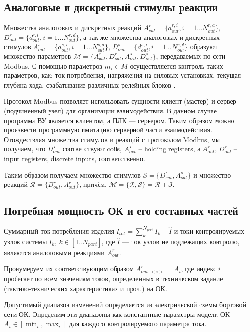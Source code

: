 \subsection{Аналоговые и дискретный стимулы реакции} \label{sect:stimulus_reactions_def}

Множества аналоговых и дискретных реакций
$A^r_{out} = \{a^{r,i}_{out}, i = 1 \dots N^{r,a}_{out}\}$,
$D^r_{out} = \{d^{r,i}_{out}, i = 1 \dots N^{r,d}_{out}\}$,
а так же множества аналоговых и дискретных стимулов
$A^s_{out} = \{a^{s,i}_{out}, i = 1 \dots N^{s,a}_{out}\}$,
$D^s_{out} = \{d^{s,i}_{out}, i = 1 \dots N^{s,d}_{out}\}$
образуют множество параметров $\mathcal{M} = \{A^r_{out}, D^r_{out}, A^s_{out}, D^s_{out}\}$,
передаваемых по сети Modbus. С помощью параметров $m_i \in M$ осуществляется контроль таких параметров,
как: ток потребления, напряжения на силовых установках,
текущая глубина хода, срабатывание различных релейных блоков \todo{\ldots}.

Протокол Modbus позволяет использовать сущности клиент (мастер) и сервер (подчиненный узел)
для организации взаимодействия. В данном случае программа ВУ является клиентом, а ПЛК --- сервером.
Таким образом можно произвести программную имитацию серверной части взаимодействия.
Отождествляя множества стимулов и реакций с протоколом Modbus, мы получаем, что
$D^s_{out}$ соответствуют coils, $A^s_{out}$ -- holding registers,
а $A^r_{out}$,  $D^r_{out}$ -- input registers, discrete inputs, соответственно.

Таким образом получаем множество стимулов $\mathcal{S} = \{D^s_{out}, A^s_{out}\}$
и множество реакций $\mathcal{R} = \{D^r_{out}, A^r_{out}\}$, причём, $\mathcal{M} = \{\mathcal{R}, \mathcal{S}\} = \mathcal{R} + \mathcal{S}$.

\subsection*{Потребная мощность ОК и его составных частей}

Суммарный ток потребления изделия $I_{tot} = \sum_k^{N_{part}} I_k + \hat I$
и токи контролируемых узлов системы $I_k,\, k\in[1..N_{part}]$,
где $\hat I$ --- ток узлов не подлежащих контролю,
являются аналоговыми реакциями $A^r_{out}$.

Пронумеруем их соответствующим образом $A^r_{out,<i>} = A_i$,
где индекс $i$ пробегает по всем значениям токов,
определённых в техническом задание (тактико-технических характеристиках и проч.) на ОК.

Допустимый диапазон изменений определяется из электрической схемы бортовой сети ОК.
Определим эти диапазоны как константные параметры модели ОК $A_i \in [\min_i, \max_i]$
для каждого контролируемого параметра тока.

